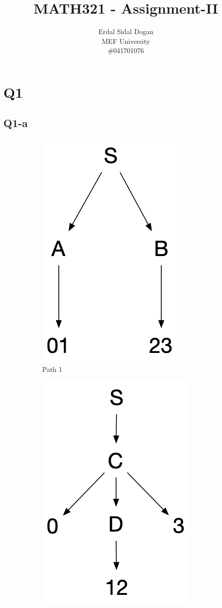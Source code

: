\documentclass{article}
\author{Erdal Sidal Dogan \\ MEF University\\ \#041701076}
\title{MATH321 - Assignment-II}
\begin{document}
	\maketitle
	\section{Q1}
 \subsection{Q1-a}
\begin{figure}[h]
	\captionsetup[subfigure]{justification=centering}

	\begin{subfigure}[h]{0.5\textwidth}
		\hspace{2.85cm}
		\includegraphics[scale=0.3]{Q1_a} 
		\caption{Path 1}
		\label{fig:subim1}
	\end{subfigure}
	\begin{subfigure}[h]{0.5\textwidth}
		\hspace{2.85cm}
		\includegraphics[scale=0.3]{Q1_b}

\end{subfigure}
\end{figure}
\end{document}
